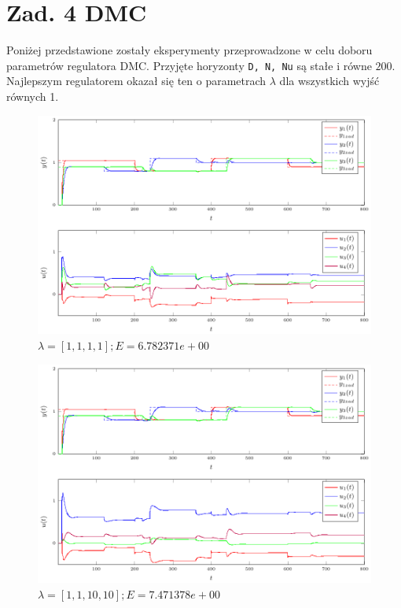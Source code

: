\documentclass[a4paper,titlepage,11pt,twosides,floatssmall]{mwrep}
\begin{document}
\chapter*{Zad. 4 DMC}

Poniżej przedstawione zostały eksperymenty przeprowadzone w celu doboru parametrów regulatora DMC. Przyjęte horyzonty \verb=D, N, Nu= są stałe i równe $200$. Najlepszym regulatorem okazał się ten o parametrach $\lambda$ dla wszystkich wyjść równych 1.


\begin{figure}[H]
	\centering
	\includegraphics[scale=1]{../wykresy/zad4_dmc_1.pdf}
	\caption{$\lambda = [1, 1, 1, 1]; E = 6.782371e+00$}
\end{figure}


\begin{figure}[H]
	\centering
	\includegraphics[scale=1]{../wykresy/zad4_dmc_2.pdf}
	\caption{$\lambda = [1, 1, 10, 10]; E = 7.471378e+00$}
\end{figure}
\end{document}
